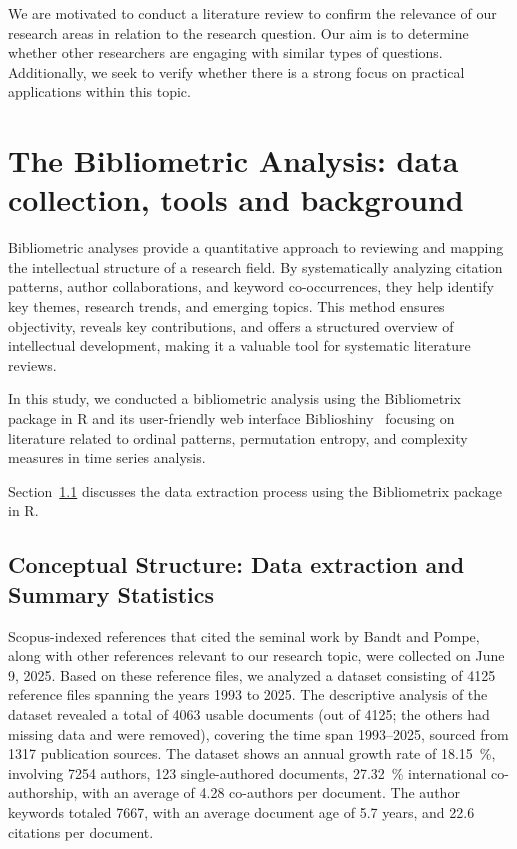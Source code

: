 We are motivated to conduct a literature review to confirm the relevance of our research areas in relation to the research question. Our aim is to determine whether other researchers are engaging with similar types of questions. Additionally, we seek to verify whether there is a strong focus on practical applications within this topic. 


\section{The Bibliometric Analysis: data collection, tools and background}\label{Sec:BiblioIntro}

Bibliometric analyses provide a quantitative approach to reviewing and mapping the intellectual structure of a research field. By systematically analyzing citation patterns, author collaborations, and keyword co-occurrences, they help identify key themes, research trends, and emerging topics. This method ensures objectivity, reveals key contributions, and offers a structured overview of intellectual development, making it a valuable tool for systematic literature reviews.

In this study, we conducted a bibliometric analysis using the Bibliometrix package in R and its user-friendly web interface Biblioshiny~\cite{Aria2017} focusing on literature related to ordinal patterns, permutation entropy, and complexity measures in time series analysis. 

Section~\ref{Subsec:Dataextraction} discusses the data extraction process using the Bibliometrix package in R.

\subsection{Conceptual Structure: Data extraction and Summary Statistics}\label{Subsec:Dataextraction}

Scopus-indexed references that cited the seminal work by Bandt and Pompe, along with other references relevant to our research topic, were collected on June 9, 2025.
Based on these reference files, we analyzed a dataset consisting of 4125 reference files spanning the years 1993 to 2025. %
The descriptive analysis of the dataset revealed a total of 4063 usable documents (out of 4125; the others had missing data and were removed), covering the time span 1993–2025, sourced from 1317 
publication sources. 
The dataset shows an annual growth rate of \SI{18.15}{\percent}, %
involving 7254 authors, 
123 single-authored documents, 
\SI{27.32}{\percent} international co-authorship, 
with an average of 4.28 co-authors per document. 
The author keywords totaled 7667, 
with an average document age of 5.7 years, %
and 22.6 citations per document. 

